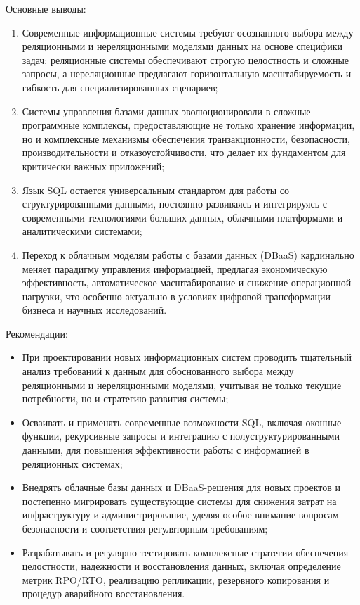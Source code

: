 \documentclass{SibFU-docs}
\begin{document}
Основные выводы:
\begin{enumerate}
\item Современные информационные системы требуют осознанного выбора между реляционными и нереляционными моделями данных на основе специфики задач: реляционные системы обеспечивают строгую целостность и сложные запросы, а нереляционные предлагают горизонтальную масштабируемость и гибкость для специализированных сценариев;
\item Системы управления базами данных эволюционировали в сложные программные комплексы, предоставляющие не только хранение информации, но и комплексные механизмы обеспечения транзакционности, безопасности, производительности и отказоустойчивости, что делает их фундаментом для критически важных приложений;
\item Язык SQL остается универсальным стандартом для работы со структурированными данными, постоянно развиваясь и интегрируясь с современными технологиями больших данных, облачными платформами и аналитическими системами;
\item Переход к облачным моделям работы с базами данных (DBaaS) кардинально меняет парадигму управления информацией, предлагая экономическую эффективность, автоматическое масштабирование и снижение операционной нагрузки, что особенно актуально в условиях цифровой трансформации бизнеса и научных исследований.
\end{enumerate}

Рекомендации:
\begin{itemize}[label=-]
\item При проектировании новых информационных систем проводить тщательный анализ требований к данным для обоснованного выбора между реляционными и нереляционными моделями, учитывая не только текущие потребности, но и стратегию развития системы;
\item Осваивать и применять современные возможности SQL, включая оконные функции, рекурсивные запросы и интеграцию с полуструктурированными данными, для повышения эффективности работы с информацией в реляционных системах;
\item Внедрять облачные базы данных и DBaaS-решения для новых проектов и постепенно мигрировать существующие системы для снижения затрат на инфраструктуру и администрирование, уделяя особое внимание вопросам безопасности и соответствия регуляторным требованиям;
\item Разрабатывать и регулярно тестировать комплексные стратегии обеспечения целостности, надежности и восстановления данных, включая определение метрик RPO/RTO, реализацию репликации, резервного копирования и процедур аварийного восстановления.
\end{itemize}
\end{document}
